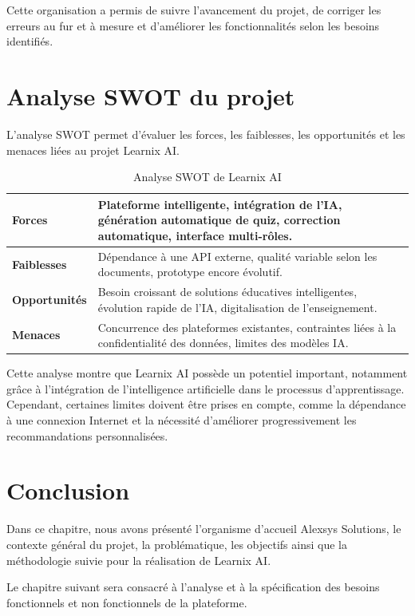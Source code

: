 \documentclass[12pt,a4paper]{report}
\begin{document}
Cette organisation a permis de suivre l'avancement du projet, de corriger les
erreurs au fur et à mesure et d'améliorer les fonctionnalités selon les besoins
identifiés.

\section{Analyse SWOT du projet}

L'analyse SWOT permet d'évaluer les forces, les faiblesses, les opportunités et
les menaces liées au projet Learnix AI.

\begin{longtable}{|m{3.5cm}|m{10cm}|}
\caption{Analyse SWOT de Learnix AI}\\
\hline
\textbf{Forces} & Plateforme intelligente, intégration de l'IA, génération automatique de quiz, correction automatique, interface multi-rôles. \\
\hline
\textbf{Faiblesses} & Dépendance à une API externe, qualité variable selon les documents, prototype encore évolutif. \\
\hline
\textbf{Opportunités} & Besoin croissant de solutions éducatives intelligentes, évolution rapide de l'IA, digitalisation de l'enseignement. \\
\hline
\textbf{Menaces} & Concurrence des plateformes existantes, contraintes liées à la confidentialité des données, limites des modèles IA. \\
\hline
\end{longtable}

Cette analyse montre que Learnix AI possède un potentiel important, notamment
grâce à l'intégration de l'intelligence artificielle dans le processus
d'apprentissage. Cependant, certaines limites doivent être prises en compte,
comme la dépendance à une connexion Internet et la nécessité d'améliorer
progressivement les recommandations personnalisées.

\section{Conclusion}

Dans ce chapitre, nous avons présenté l'organisme d'accueil Alexsys Solutions, le contexte général du projet, la problématique, les objectifs ainsi que la méthodologie suivie pour la réalisation de Learnix AI.

Le chapitre suivant sera consacré à l'analyse et à la spécification des besoins fonctionnels et non fonctionnels de la plateforme.
\end{document}
